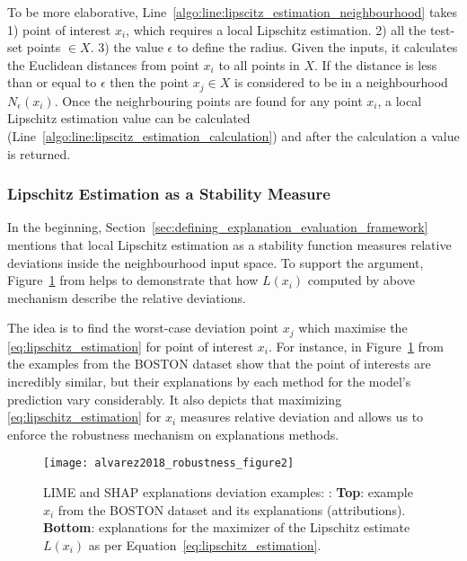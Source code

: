\documentclass[english]{tktltiki2}
\theoremstyle{definition}
\theoremstyle{remark}
\begin{document}
To be more elaborative, Line~\ref{algo:line:lipscitz_estimation_neighbourhood}
takes 1)  point of interest $x_i$, which requires a local Lipschitz estimation. 2) all the test-set points $ \in X$. 3) the value $\epsilon$ to define the radius. Given the inputs, it calculates the Euclidean distances from point $x_i$ to all points in $X$. If the distance is less than or equal to $\epsilon$ then the point $x_j \in X$ is considered to be in a neighbourhood $N_{\epsilon}(x_i)$. Once the neighrbouring points are found for any point $x_i$, a local Lipschitz estimation value can be calculated (Line~\ref{algo:line:lipscitz_estimation_calculation}) and after the calculation a value is returned.

\subsubsection{Lipschitz Estimation as a Stability Measure}\label{sec:lipschitz_estimation_as_a_stability_measure} %
In the beginning, Section~\ref{sec:defining_explanation_evaluation_framework} mentions that local Lipschitz estimation as a stability function measures relative deviations inside the neighbourhood input space. To support the argument, Figure~\ref{fig:alvarez2018_robustness_figure2} from \citet{alvarez2018robustness} helps to demonstrate that how $L(x_i)$ computed by above mechanism describe the relative deviations.

The idea is to find the worst-case deviation point $x_j$ which maximise the \eqref{eq:lipschitz_estimation} for point of interest $x_i$. For instance, in Figure~\ref{fig:alvarez2018_robustness_figure2} from \citet{alvarez2018robustness} the examples from the BOSTON dataset show that the point of interests are incredibly similar, but their explanations by each method for the model’s prediction vary considerably. It also depicts that maximizing \eqref{eq:lipschitz_estimation} for $x_i$ measures relative deviation and allows us to enforce the robustness mechanism on explanations methods.
\begin{figure}[H]
	\texttt{[image: alvarez2018\_robustness\_figure2]}
	\vspace*{-10mm}
	\caption{LIME and SHAP explanations deviation examples: \citep{alvarez2018robustness}: \textbf{Top}: example $x_i$ from the BOSTON dataset and its explanations (attributions). \textbf{Bottom}: explanations for the maximizer of the Lipschitz estimate $L(x_i)$ as per Equation~\eqref{eq:lipschitz_estimation}.}
	\label{fig:alvarez2018_robustness_figure2}
\end{figure}
\end{document}
